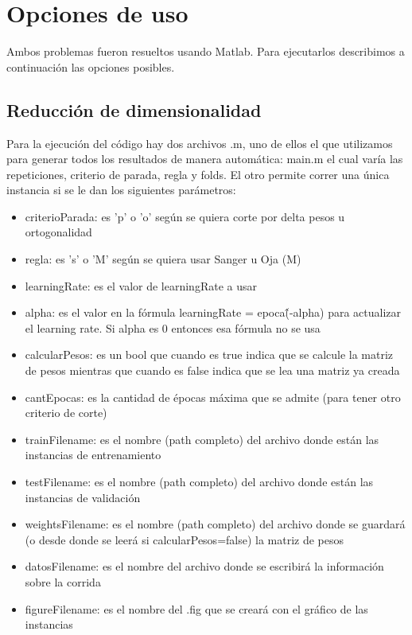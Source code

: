 \documentclass[informe.tex]{subfiles}
\begin{document}
  
  \section{Opciones de uso}

    Ambos problemas fueron resueltos usando Matlab. Para ejecutarlos describimos a continuación las opciones posibles.
  
    \subsection{Reducción de dimensionalidad}
      Para la ejecución del código hay dos archivos .m, uno de ellos el que utilizamos para generar todos los resultados de manera autom\'atica: main.m el cual varía las repeticiones, criterio de parada, regla y folds. El otro permite correr una única instancia si se le dan los siguientes par\'ametros:
      
      \begin{itemize}
	\item criterioParada: es 'p' o 'o' seg\'un se quiera corte por delta pesos u ortogonalidad
	\item regla: es 's' o 'M' seg\'un se quiera usar Sanger u Oja (M)
	\item learningRate: es el valor de learningRate a usar
	\item alpha: es el valor en la f\'ormula learningRate = epoca\^(-alpha) para actualizar el learning rate. Si alpha es 0 entonces esa f\'ormula no se usa
	\item calcularPesos: es un bool que cuando es true indica que se calcule la matriz de pesos mientras que cuando es false indica que se lea una matriz ya creada
	\item cantEpocas: es la cantidad de \'epocas m\'axima que se admite (para tener otro criterio de corte)
	\item trainFilename: es el nombre (path completo) del archivo donde est\'an las instancias de entrenamiento
	\item testFilename: es el nombre (path completo) del archivo donde est\'an las instancias de validaci\'on
	\item weightsFilename: es el nombre (path completo) del archivo donde se guardar\'a (o desde donde se leer\'a si calcularPesos=false) la matriz de pesos
	\item datosFilename: es el nombre del archivo donde se escribir\'a la informaci\'on sobre la corrida
	\item figureFilename: es el nombre del .fig que se crear\'a con el gr\'afico de las instancias
      \end{itemize}
      
    
\end{document}
